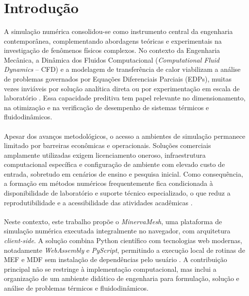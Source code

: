\section{Introdução}
\label{sec:introducao}

\paragraph{}A simulação numérica consolidou-se como instrumento central da engenharia contemporânea, complementando abordagens teóricas e experimentais na investigação de fenômenos físicos complexos. No contexto da Engenharia Mecânica, a Dinâmica dos Fluidos Computacional (\textit{Computational Fluid Dynamics} -- CFD) e a modelagem de transferência de calor viabilizam a análise de problemas governados por Equações Diferenciais Parciais (EDPs), muitas vezes inviáveis por solução analítica direta ou por experimentação em escala de laboratório \cite{Maliska2004,Versteeg2007}. Essa capacidade preditiva tem papel relevante no dimensionamento, na otimização e na verificação de desempenho de sistemas térmicos e fluidodinâmicos.

\paragraph{}Apesar dos avanços metodológicos, o acesso a ambientes de simulação permanece limitado por barreiras econômicas e operacionais. Soluções comerciais amplamente utilizadas exigem licenciamento oneroso, infraestrutura computacional específica e configuração de ambiente com elevado custo de entrada, sobretudo em cenários de ensino e pesquisa inicial. Como consequência, a formação em métodos numéricos frequentemente fica condicionada à disponibilidade de laboratório e suporte técnico especializado, o que reduz a reprodutibilidade e a acessibilidade das atividades acadêmicas \cite{Anjos2013}.

\paragraph{}Neste contexto, este trabalho propõe o \textit{MinervaMesh}, uma plataforma de simulação numérica executada integralmente no navegador, com arquitetura \textit{client-side}. A solução combina Python científico com tecnologias web modernas, notadamente \textit{WebAssembly} e \textit{PyScript}, permitindo a execução local de rotinas de MEF e MDF sem instalação de dependências pelo usuário \cite{PyScript2023,Harris2020}. A contribuição principal não se restringe à implementação computacional, mas inclui a organização de um ambiente didático de engenharia para formulação, solução e análise de problemas térmicos e fluidodinâmicos.

